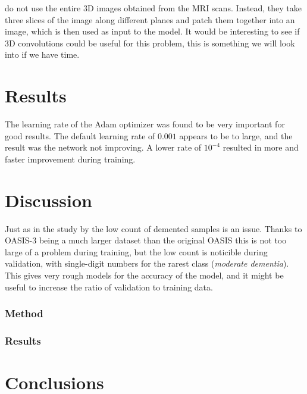 \documentclass{kththesis}
\begin{document}
\textcite{islam2018early} do not use the entire 3D images obtained from the MRI scans. Instead, they take three slices of the image along different planes and patch them together into an image, which is then used as input to the model. It would be interesting to see if 3D convolutions could be useful for this problem, this is something we will look into if we have time.

\chapter{Results}
The learning rate of the Adam optimizer was found to be very important for good results. The default learning rate of $0.001$ appears to be to large, and the result was the network not improving. A lower rate of $10^{-4}$ resulted in more and faster improvement during training.

\chapter{Discussion}
Just as in the study by \textcite{islam2018early} the low count of demented samples is an issue. Thanks to OASIS-3 being a much larger dataset than the original OASIS this is not too large of a problem during training, but the low count is noticible during validation, with single-digit numbers for the rarest class (\textit{moderate dementia}). This gives very rough models for the accuracy of the model, and it might be useful to increase the ratio of validation to training data.

\subsection{Method}
\subsection{Results}

\chapter{Conclusions}

\printbibliography[heading=bibintoc]

\appendix


\tailmatter
\end{document}
